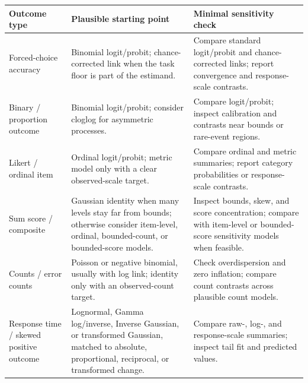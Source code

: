 \documentclass[
  man,
  floatsintext,
  longtable,
  nolmodern,
  notxfonts,
  notimes,
  colorlinks=true,linkcolor=blue,citecolor=blue,urlcolor=blue]{apa7}
\newcounter{none} %
\begin{document}
\begin{table}

{\caption{{Practical starting points for link-aware interaction testing
across common psychological outcomes.}{\label{tbl-link-aware-workflow}}}
\vspace{-20pt}}

{\def\LTcaptype{none} %
\begin{longtable}[]{@{}
  >{\raggedright\arraybackslash}p{}
  >{\raggedright\arraybackslash}p{}
  >{\raggedright\arraybackslash}p{}@{}}
\toprule\noalign{}
\begin{minipage}[b]{\linewidth}\raggedright
Outcome type
\end{minipage} & \begin{minipage}[b]{\linewidth}\raggedright
Plausible starting point
\end{minipage} & \begin{minipage}[b]{\linewidth}\raggedright
Minimal sensitivity check
\end{minipage} \\
\midrule\noalign{}
\endhead
\bottomrule\noalign{}
\endlastfoot
Forced-choice accuracy & Binomial logit/probit; chance-corrected link
when the task floor is part of the estimand. & Compare standard
logit/probit and chance-corrected links; report convergence and
response-scale contrasts. \\
Binary / proportion outcome & Binomial logit/probit; consider cloglog
for asymmetric processes. & Compare logit/probit; inspect calibration
and contrasts near bounds or rare-event regions. \\
Likert / ordinal item & Ordinal logit/probit; metric model only with a
clear observed-scale target. & Compare ordinal and metric summaries;
report category probabilities or response-scale contrasts. \\
Sum score / composite & Gaussian identity when many levels stay far from
bounds; otherwise consider item-level, ordinal, bounded-count, or
bounded-score models. & Inspect bounds, skew, and score concentration;
compare with item-level or bounded-score sensitivity models when
feasible. \\
Counts / error counts & Poisson or negative binomial, usually with log
link; identity only with an observed-count target. & Check
overdispersion and zero inflation; compare count contrasts across
plausible count models. \\
Response time / skewed positive outcome & Lognormal, Gamma log/inverse,
Inverse Gaussian, or transformed Gaussian, matched to absolute,
proportional, reciprocal, or transformed change. & Compare raw-, log-,
and response-scale summaries; inspect tail fit and predicted values. \\
\end{longtable}
}

\end{table}
\end{document}
